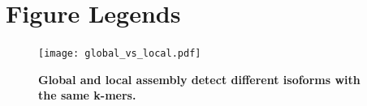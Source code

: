 \documentclass[10pt]{article}
\begin{document}
\section*{Figure Legends}

\begin{figure}[!ht]
\begin{center}
\texttt{[image: global\_vs\_local.pdf]}
\end{center}
\caption{
{\bf Global and local assembly detect different isoforms with the same k-mers.} 
}
\label{global_vs_local}
\end{figure}




% 
\end{document}
